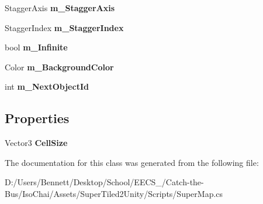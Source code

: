 \begin{DoxyCompactItemize}
\item 
\mbox{\label{class_super_tiled2_unity_1_1_super_map_a42a57e39329fe62535f9cdab811a6553}} 
Stagger\+Axis {\bfseries m\+\_\+\+Stagger\+Axis}
\item 
\mbox{\label{class_super_tiled2_unity_1_1_super_map_a507b9440013104ddee2ebfe2b95e87e6}} 
Stagger\+Index {\bfseries m\+\_\+\+Stagger\+Index}
\item 
\mbox{\label{class_super_tiled2_unity_1_1_super_map_a13d349842b6dbc53ab126d42db9780c8}} 
bool {\bfseries m\+\_\+\+Infinite}
\item 
\mbox{\label{class_super_tiled2_unity_1_1_super_map_a79cb63a54ea773a7ab49ee9f0d172a83}} 
Color {\bfseries m\+\_\+\+Background\+Color}
\item 
\mbox{\label{class_super_tiled2_unity_1_1_super_map_ab9434c8c522f3d1835a76ea21e9fd732}} 
int {\bfseries m\+\_\+\+Next\+Object\+Id}
\end{DoxyCompactItemize}
\subsection*{Properties}
\begin{DoxyCompactItemize}
\item 
\mbox{\label{class_super_tiled2_unity_1_1_super_map_a04b1a257fe28d3cb6550cffd321d665b}} 
Vector3 {\bfseries Cell\+Size}
\end{DoxyCompactItemize}


The documentation for this class was generated from the following file\+:\begin{DoxyCompactItemize}
\item 
D\+:/\+Users/\+Bennett/\+Desktop/\+School/\+E\+E\+C\+S\+\_/\+Catch-\/the-\/\+Bus/\+Iso\+Chai/\+Assets/\+Super\+Tiled2\+Unity/\+Scripts/Super\+Map.\+cs\end{DoxyCompactItemize}

